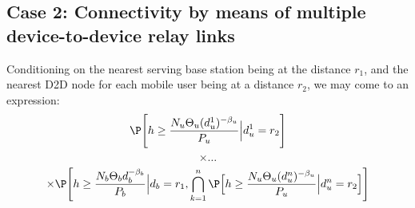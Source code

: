 \subsection{Case 2: Connectivity by means of multiple device-to-device relay links}
Conditioning on the nearest serving base station being at the distance \(r_1\), and the nearest D2D node for each mobile user being at a distance \(r_2\), we may come to an expression:
\[\P\Bigg[h\ge\frac{N_u\Theta_u (d_u^1)^{-\beta_u}}{P_u}\Big|d_u^1=r_2\Bigg]\]
\[\times\dots\]
\[\times\P\Bigg[h\ge\frac{N_b\Theta_b d_b^{-\beta_b}}{P_b}\Big|d_b=r_1,\bigcap\limits_{k=1}^{n}\P\Big[h\ge\frac{N_u\Theta_u (d_u^n)^{-\beta_u}}{P_u}\Big|d_u^n=r_2\Big]\Bigg]\]
